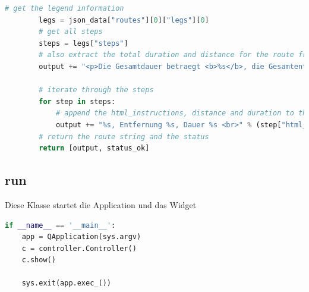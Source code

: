 \begin{lstlisting}[language=python]
		# get the legend information
		legs = json_data["routes"][0]["legs"][0]
		# get all steps
		steps = legs["steps"]
		# also extract the total duration and distance for the route from the legend
		output += "<p>Die Gesamtdauer betraegt <b>%s</b>, die Gesamtentfernung: <b>%s</b> </p>" % (legs["duration"]["text"], legs["distance"]["text"])
		
		# iterate through the steps
		for step in steps:
			# append the html_instructions, distance and duration to the output string
			output += "%s, Entfernung %s, Dauer %s <br>" % (step["html_instructions"], step["distance"]["text"], step["duration"]["text"])
		# return the route string and the status
		return [output, status_ok]
\end{lstlisting}

\subsection{run}
Diese Klasse startet die Application und das Widget

\begin{lstlisting}[language=python]
if __name__ == '__main__':
	app = QApplication(sys.argv)
	c = controller.Controller()
	c.show()
	
	sys.exit(app.exec_())

\end{lstlisting}